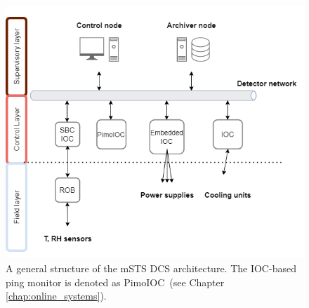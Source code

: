 \begin{figure}[!h]
\centering
\includegraphics[width=0.65\columnwidth]{Chapter6/DCS/images/mcbmpng (2).png}
\caption{A general structure of the \gls{mSTS} \gls{DCS} architecture. The IOC-based ping monitor is denoted as PimoIOC~(see Chapter \ref{chap:online_systems}).}
\label{fig_mstsarch}
\end{figure}

